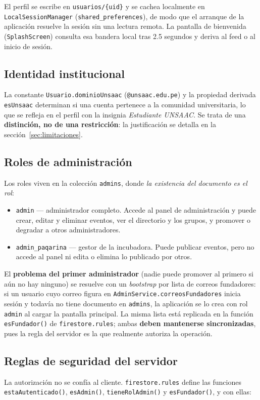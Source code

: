 \documentclass[12pt,a4paper]{article}
\begin{document}
El perfil se escribe en \texttt{usuarios/\{uid\}} y se cachea localmente en \texttt{LocalSessionManager} (\texttt{shared\_preferences}), de modo que el arranque de la aplicación resuelve la sesión sin una lectura remota. La pantalla de bienvenida (\texttt{SplashScreen}) consulta esa bandera local tras 2.5 segundos y deriva al feed o al inicio de sesión.

\subsection{Identidad institucional}
La constante \texttt{Usuario.dominioUnsaac} (\texttt{@unsaac.edu.pe}) y la propiedad derivada \texttt{esUnsaac} determinan si una cuenta pertenece a la comunidad universitaria, lo que se refleja en el perfil con la insignia \emph{Estudiante UNSAAC}. Se trata de una \textbf{distinción, no de una restricción}: la justificación se detalla en la sección~\ref{sec:limitaciones}.

\subsection{Roles de administración}
Los roles viven en la colección \texttt{admins}, donde \emph{la existencia del documento es el rol}:

\begin{itemize}
    \item \texttt{admin} --- administrador completo. Accede al panel de administración y puede crear, editar y eliminar eventos, ver el directorio y los grupos, y promover o degradar a otros administradores.
    \item \texttt{admin\_paqarina} --- gestor de la incubadora. Puede publicar eventos, pero no accede al panel ni edita o elimina lo publicado por otros.
\end{itemize}

El \textbf{problema del primer administrador} (nadie puede promover al primero si aún no hay ninguno) se resuelve con un \emph{bootstrap} por lista de correos fundadores: si un usuario cuyo correo figura en \texttt{AdminService.correosFundadores} inicia sesión y todavía no tiene documento en \texttt{admins}, la aplicación se lo crea con rol \texttt{admin} al cargar la pantalla principal. La misma lista está replicada en la función \texttt{esFundador()} de \texttt{firestore.rules}; ambas \textbf{deben mantenerse sincronizadas}, pues la regla del servidor es la que realmente autoriza la operación.

\subsection{Reglas de seguridad del servidor}
La autorización no se confía al cliente. \texttt{firestore.rules} define las funciones \texttt{estaAutenticado()}, \texttt{esAdmin()}, \texttt{tieneRolAdmin()} y \texttt{esFundador()}, y con ellas:
\end{document}
